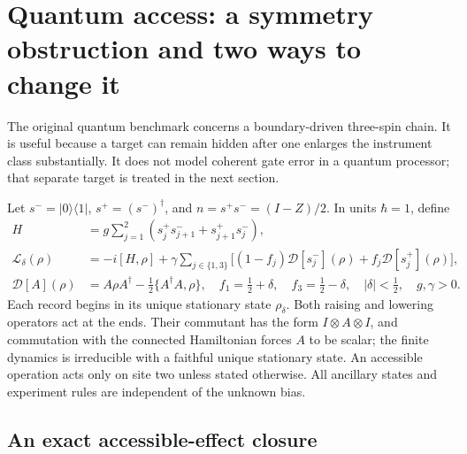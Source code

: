 \section[Quantum access and hidden bias]{Quantum access: a symmetry obstruction and two ways to change it}
\label{sec:applications-xx}

The original quantum benchmark concerns a boundary-driven three-spin chain.
It is useful because a target can remain hidden after one enlarges the
instrument class substantially. It does not model coherent gate error in a
quantum processor; that separate target is treated in the next section.

Let $s^-=|0\rangle\langle1|$, $s^+=(s^-)^\dagger$, and
$n=s^+s^-=(I-Z)/2$. In units $\hbar=1$, define
\begin{align}
 H&=g\sum_{j=1}^2(s_j^+s_{j+1}^-+s_{j+1}^+s_j^-),\nonumber\\
 \mathcal L_\delta(\rho)
 &=-i[H,\rho]+\gamma\sum_{j\in\{1,3\}}
 \big[(1-f_j)\mathcal D[s_j^-](\rho)+f_j\mathcal D[s_j^+](\rho)\big],
 \label{eq:applications-xx}\\
 \mathcal D[A](\rho)&=A\rho A^\dagger-\tfrac12\{A^\dagger A,\rho\},
 \quad f_1=\tfrac12+\delta,\quad f_3=\tfrac12-\delta,
 \quad |\delta|<\tfrac12,\quad g,\gamma>0.\nonumber
\end{align}
Each record begins in its unique stationary state $\rho_\delta$. Both raising
and lowering operators act at the ends. Their commutant has the form
$I\otimes A\otimes I$, and commutation with the connected Hamiltonian forces
$A$ to be scalar; the finite dynamics is irreducible with a faithful unique
stationary state. An accessible operation acts only on site two unless stated
otherwise. All ancillary states and experiment rules are independent of the
unknown bias.

\subsection{An exact accessible-effect closure}

